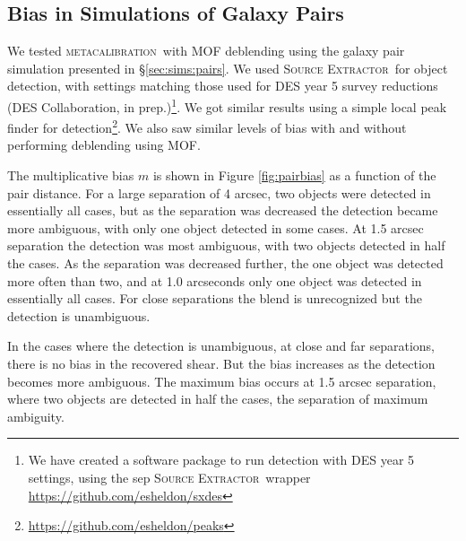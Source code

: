 \documentclass[iop, appendixfloats, numberedappendix, apj]{emulateapj}
\newcommand{\mcal}{\textsc{metacalibration}}
\newcommand{\sx}{\textsc{Source Extractor}}
\begin{document}
\subsection{Bias in Simulations of Galaxy Pairs}

We tested \mcal\ with MOF deblending using the galaxy pair simulation presented
in \S \ref{sec:sims:pairs}. We used \sx\ for object detection, with settings
matching those used for DES year 5 survey reductions (DES Collaboration, in
prep.)\footnote{We have created a software package to run detection with DES
year 5 settings, using the sep \sx\ wrapper
\url{https://github.com/esheldon/sxdes}}.  We got similar results using a
simple local peak finder for
detection\footnote{\url{https://github.com/esheldon/peaks}}.  We also saw
similar levels of bias with and without performing deblending using MOF.

The multiplicative bias $m$ is shown in Figure \ref{fig:pairbias} as a function
of the pair distance. For a large separation of 4 arcsec, two objects were
detected in essentially all cases, but as the separation was decreased the
detection became more ambiguous, with only one object detected in some cases.
At 1.5 arcsec separation the detection was most ambiguous, with two objects
detected in half the cases. As the separation was decreased further, the one
object was detected more often than two, and at 1.0 arcseconds only one object
was detected in essentially all cases.  For close separations the blend is
unrecognized but the detection is unambiguous.

In the cases where the detection is unambiguous, at close and far separations,
there is no bias in the recovered shear.  But the bias increases as the
detection becomes more ambiguous. The maximum bias occurs at 1.5 arcsec
separation, where two objects are detected in half the cases, the separation of
maximum ambiguity.
\end{document}
